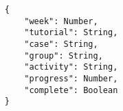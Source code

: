 
\begin{lstlisting}
	{
		"week": Number,
		"tutorial": String,
		"case": String,
		"group": String,
		"activity": String,
		"progress": Number,
		"complete": Boolean
	}
\end{lstlisting}
